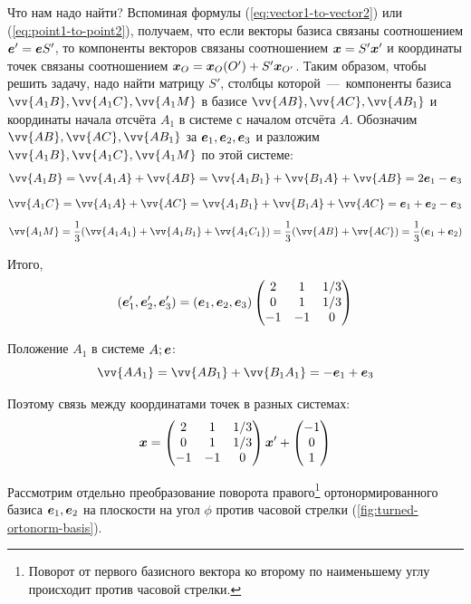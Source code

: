 \documentclass[a4paper,12pt]{article}
\begin{document}
  \begin{solution}
    Что нам надо найти?
    Вспоминая формулы (\ref{eq:vector1-to-vector2}) или (\ref{eq:point1-to-point2}), получаем, что если векторы базиса связаны соотношением $\bds e' \hm= \bds e S'$, то компоненты векторов связаны соотношением $\bds x \hm= S' \bds x'$ и координаты точек связаны соотношением $\bds x_{O} \hm= \bds x_{O}(O') \hm+ S' \bds x_{O'}$.
    Таким образом, чтобы решить задачу, надо найти матрицу $S'$, столбцы которой~---~компоненты базиса $\vv{A_1 B}, \vv{A_1 C}, \vv{A_1 M}$ в базисе $\vv{AB}, \vv{AC}, \vv{AB_1}$ и координаты начала отсчёта $A_1$ в системе с началом отсчёта $A$.
    Обозначим $\vv{AB}, \vv{AC}, \vv{AB_1}$ за $\boldsymbol e_1, \boldsymbol e_2, \boldsymbol e_3$ и разложим $\vv{A_1 B}, \vv{A_1 C}, \vv{A_1 M}$ по этой системе:
    \[
      \vv{A_1 B} = \vv{A_1 A} + \vv{AB} = \vv{A_1 B_1} + \vv{B_1 A} + \vv{AB} = 2 \bds e_1 - \bds e_3
    \]
    \[
      \vv{A_1 C} = \vv{A_1 A} + \vv{AC} = \vv{A_1 B_1} + \vv{B_1 A} + \vv{AC} = \bds e_1 + \bds e_2 - \bds e_3
    \]
    \[
      \vv{A_1 M} = \frac{1}{3} (\vv{A_1 A_1} + \vv{A_1 B_1} + \vv{A_1 C_1}) = \frac{1}{3} (\vv{AB} + \vv{AC})
        = \frac{1}{3} (\bds e_1 + \bds e_2)
    \]
    
    Итого,
    \[
      (\boldsymbol e_1', \boldsymbol e_2', \boldsymbol e_3') = (\boldsymbol e_1, \boldsymbol e_2, \boldsymbol e_3) \begin{pmatrix}
        2 & 1 & 1/3\\
        0 & 1 & 1/3\\
        -1 & -1 & 0
      \end{pmatrix}
    \]
    
    Положение $A_1$ в системе $A; \boldsymbol e$:
    \[
      \vv{AA_1} = \vv{AB_1} + \vv{B_1 A_1} = -\bds e_1 + \bds e_3
    \]
    
    Поэтому связь между координатами точек в разных системах:
    \[
      \boldsymbol x = \begin{pmatrix}
        2 & 1 & 1/3\\
        0 & 1 & 1/3\\
        -1 & -1 & 0
      \end{pmatrix} \boldsymbol x'
      + \begin{pmatrix}
        -1\\
        0\\
        1
      \end{pmatrix}
    \]
  \end{solution}
  
  Рассмотрим отдельно преобразование поворота правого\footnote{Поворот от первого базисного вектора ко второму по наименьшему углу происходит против часовой стрелки.} ортонормированного базиса $\boldsymbol e_1, \boldsymbol e_2$ на плоскости на угол $\phi$ против часовой стрелки (\ref{fig:turned-ortonorm-basis}).
\end{document}
